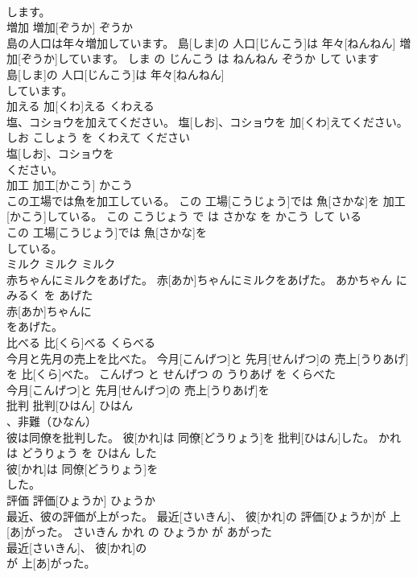 \documentclass[8pt]{extreport}
\begin{document}
\begin{CJK}{UTF8}{min}
\\	します。			
\\	増加	増加[ぞうか]	ぞうか	
\\	島の人口は年々増加しています。	島[しま]の 人口[じんこう]は 年々[ねんねん] 増加[ぞうか]しています。	しま の じんこう は ねんねん ぞうか して います	
\\	島[しま]の 人口[じんこう]は 年々[ねんねん]
\\	しています。			
\\	加える	加[くわ]える	くわえる	
\\	塩、コショウを加えてください。	塩[しお]、コショウを 加[くわ]えてください。	しお こしょう を くわえて ください	
\\	塩[しお]、コショウを
\\	ください。			
\\	加工	加工[かこう]	かこう	
\\	この工場では魚を加工している。	この 工場[こうじょう]では 魚[さかな]を 加工[かこう]している。	この こうじょう で は さかな を かこう して いる	
\\	この 工場[こうじょう]では 魚[さかな]を
\\	している。			
\\	ミルク	ミルク	ミルク	
\\	赤ちゃんにミルクをあげた。	赤[あか]ちゃんにミルクをあげた。	あかちゃん に みるく を あげた	
\\	赤[あか]ちゃんに
\\	をあげた。			
\\	比べる	比[くら]べる	くらべる	
\\	今月と先月の売上を比べた。	今月[こんげつ]と 先月[せんげつ]の 売上[うりあげ]を 比[くら]べた。	こんげつ と せんげつ の うりあげ を くらべた	
\\	今月[こんげつ]と 先月[せんげつ]の 売上[うりあげ]を
\\	批判	批判[ひはん]	ひはん	
\\	、非難（ひなん）		
\\	彼は同僚を批判した。	彼[かれ]は 同僚[どうりょう]を 批判[ひはん]した。	かれ は どうりょう を ひはん した	
\\	彼[かれ]は 同僚[どうりょう]を
\\	した。			
\\	評価	評価[ひょうか]	ひょうか	
\\	最近、彼の評価が上がった。	最近[さいきん]、 彼[かれ]の 評価[ひょうか]が 上[あ]がった。	さいきん かれ の ひょうか が あがった	
\\	最近[さいきん]、 彼[かれ]の
\\	が 上[あ]がった。			

\end{CJK}
\end{document}
